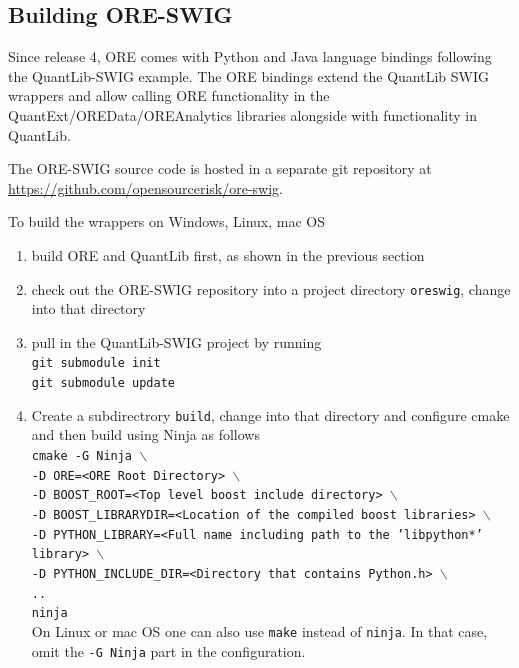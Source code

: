 \documentclass[12pt, a4paper]{article}
\begin{document}
{\subsection{Building ORE-SWIG}\label{sec:oreswig}

Since release 4, ORE comes with Python and Java language bindings following the QuantLib-SWIG example.
The ORE bindings extend the QuantLib SWIG wrappers and allow calling ORE functionality in the 
QuantExt/OREData/OREAnalytics libraries alongside with functionality in QuantLib.  

\medskip
The ORE-SWIG source code is hosted in a separate git repository at \url{https://github.com/opensourcerisk/ore-swig}.

\medskip
To build the wrappers on Windows, Linux, mac OS
\begin{enumerate}
\item build ORE and QuantLib first, as shown in the previous section
\item check out the ORE-SWIG repository into a project directory {\tt oreswig}, change into that directory
\item pull in the QuantLib-SWIG project by running \\
{\tt git submodule init} \\
{\tt git submodule update}
\item Create a subdirectrory {\tt build}, change into that directory and configure cmake and then build using Ninja as follows \\
\medskip
{\footnotesize
{\tt cmake -G Ninja $\backslash$} \\
\hspace{1cm} {\tt -D ORE=<ORE Root Directory> $\backslash$} \\
\hspace{1cm} {\tt -D BOOST\_ROOT=<Top level boost include directory> $\backslash$}\\
\hspace{1cm} {\tt -D BOOST\_LIBRARYDIR=<Location of the compiled boost libraries> $\backslash$}\\
\hspace{1cm} {\tt -D PYTHON\_LIBRARY=<Full name including path to the 'libpython*' library> $\backslash$} \\
\hspace{1cm} {\tt -D PYTHON\_INCLUDE\_DIR=<Directory that contains Python.h> $\backslash$} \\
\hspace{1cm} {\tt ..} \\
{\tt ninja} \\
}
\medskip
On Linux or mac OS one can also use {\tt make} instead of {\tt ninja}. 
In that case, omit the {\tt -G Ninja} part in the configuration. 


\end{enumerate}}
\end{document}
